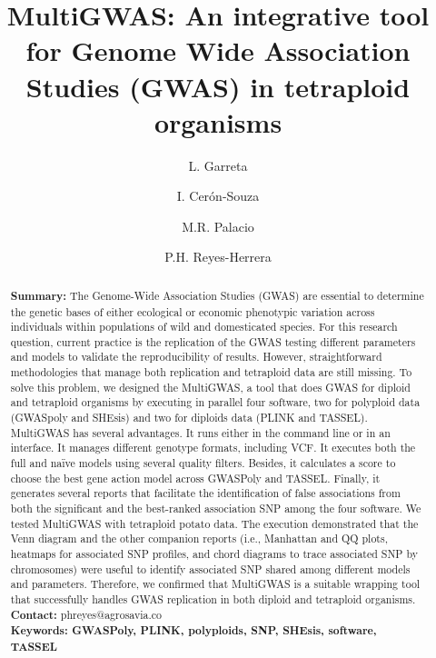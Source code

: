 \documentclass{article}
\begin{document}
\title{MultiGWAS: An integrative tool for Genome Wide Association Studies (GWAS) in tetraploid organisms}

\author[1]{L. Garreta}
\author[1]{I. Cer\'{o}n-Souza}
\author[2]{M.R. Palacio}
\author[1]{P.H. Reyes-Herrera}




\maketitle

\begin{abstract}
\textbf{Summary:} The Genome-Wide Association Studies (GWAS) are essential to determine the genetic bases of either ecological or economic phenotypic variation across individuals within populations of wild and domesticated species. For this research question, current practice is the replication of the GWAS testing different parameters and models to validate the reproducibility of results. However, straightforward methodologies that manage both replication and tetraploid data are still missing. To solve this problem, we designed the MultiGWAS, a tool that does GWAS for diploid and tetraploid organisms by executing in parallel four software, two for polyploid data (GWASpoly and SHEsis) and two for diploids data (PLINK and TASSEL). MultiGWAS has several advantages. It runs either in the command line or in an interface. It manages different genotype formats, including VCF. It executes both the full and naïve models using several quality filters. Besides, it calculates a score to choose the best gene action model across GWASPoly and TASSEL. Finally, it generates several reports that facilitate the identification of false associations from both the significant and the best-ranked association SNP among the four software. We tested MultiGWAS with tetraploid potato data. The execution demonstrated that the Venn diagram and the other companion reports (i.e., Manhattan and QQ plots, heatmaps for associated SNP profiles, and chord diagrams to trace associated SNP by chromosomes) were useful to identify associated SNP shared among different models and parameters. Therefore, we confirmed that MultiGWAS is a suitable wrapping tool that successfully handles GWAS replication in both diploid and tetraploid organisms. \\
\textbf{Contact:} phreyes@agrosavia.co\\
\textbf{Keywords: GWASPoly, PLINK, polyploids, SNP, SHEsis, software, TASSEL}
\end{abstract}
\end{document}
